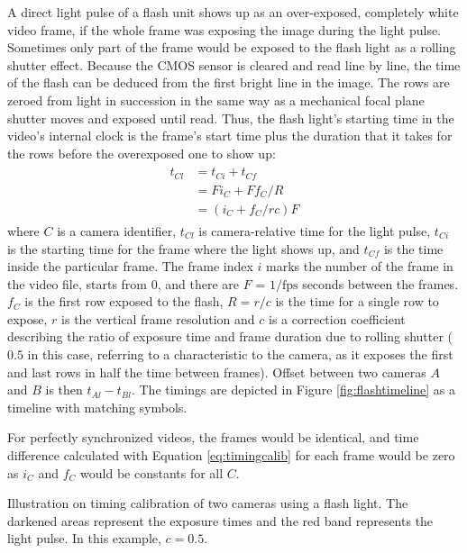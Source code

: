 
A direct light pulse of a flash unit shows up as an over-exposed, completely white video frame, if the whole frame was exposing the image during the light pulse.
Sometimes only part of the frame would be exposed to the flash light as a rolling shutter effect.
Because the CMOS sensor is cleared and read line by line, the time of the flash can be deduced from the first bright line in the image.
The rows are zeroed from light in succession in the same way as a mechanical focal plane shutter moves and exposed until read.
Thus, the flash light's starting time in the video's internal clock is the frame's start time plus the duration that it takes for the rows before the overexposed one to show up:
\begin{align} \begin{split} \label{eq:timingcalib}
t_{Cl} &= t_{Ci} + t_{Cf} \\
&= F i_C + F f_C / R \\
&= (i_C + f_C / r c) F
\end{split} \end{align}
where $C$ is a camera identifier, $t_{Cl}$ is camera-relative time for the light pulse, $t_{Ci}$ is the starting time for the frame where the light shows up, and $t_{Cf}$ is the time inside the particular frame.
The frame index $i$ marks the number of the frame in the video file, starts from 0, and there are $F$ = $1/\text{fps}$ seconds between the frames.
$f_C$ is the first row exposed to the flash, $R = r / c$ is the time for a single row to expose, $r$ is the vertical frame resolution and $c$ is a correction coefficient describing the ratio of exposure time and frame duration due to rolling shutter ($0.5$ in this case, referring to a characteristic to the camera, as it exposes the first and last rows in half the time between frames).
Offset between two cameras $A$ and $B$ is then $t_{Al} - t_{Bl}$.
The timings are depicted in Figure \ref{fig:flashtimeline} as a timeline with matching symbols.

For perfectly synchronized videos, the frames would be identical, and time difference calculated with Equation \ref{eq:timingcalib} for each frame would be zero as $i_C$ and $f_C$ would be constants for all $C$.

{Illustration on timing calibration of two cameras using a flash light.
The darkened areas represent the exposure times and the red band represents the light pulse.
In this example, $c = 0.5$.
}

